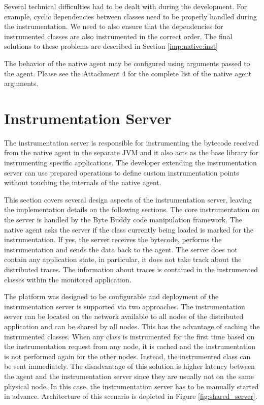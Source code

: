 Several technical difficulties had to be dealt with during the development. For example, cyclic dependencies between classes need to be properly handled during the instrumentation. We need to also ensure that the dependencies for instrumented classes are also instrumented in the correct order. The final solutions to these problems are described in Section \ref{imp:native:inst}

The behavior of the native agent may be configured using arguments passed to the agent. Please see the Attachment 4 for the complete list of the native agent arguments.

\section{Instrumentation Server}
\label{sec:inst_server}
The instrumentation server is responsible for instrumenting the bytecode received from the native agent in the separate JVM and it also acts as the base library for instrumenting specific applications. The developer extending the instrumentation server can use prepared operations to define custom instrumentation points without touching the internals of the native agent.

This section covers several design aspects of the instrumentation server, leaving the implementation details on the following sections. The core instrumentation on the server is handled by the Byte Buddy code manipulation framework. The native agent asks the server if the class currently being loaded is marked for the instrumentation. If yes, the server receives the bytecode, performs the instrumentation and sends the data back to the agent. The server does not contain any application state, in particular, it does not take track about the distributed traces. The information about traces is contained in the instrumented classes within the monitored application.

The platform was designed to be configurable and deployment of the instrumentation server is supported via two approaches. The instrumentation server can be located on the network available to all nodes of the distributed application and can be shared by all nodes. This has the advantage of caching the instrumented classes. When any class is instrumented for the first time based on the instrumentation request from any node, it is cached and the instrumentation is not performed again for the other nodes. Instead, the instrumented class can be sent immediately. The disadvantage of this solution is higher latency between the agent and the instrumentation server since they are usually not on the same physical node. In this case, the instrumentation server has to be manually started in advance. Architecture of this scenario is depicted in Figure \ref{fig:shared_server}.
 
